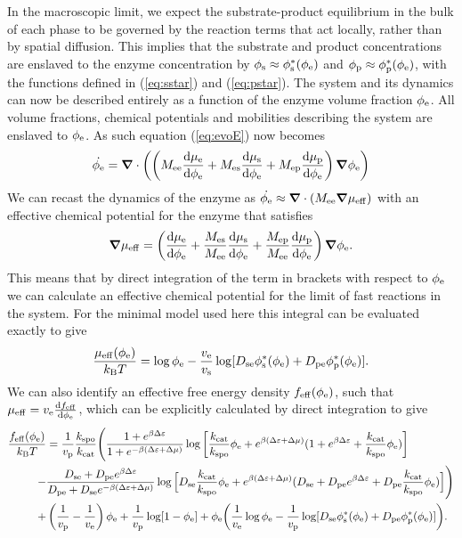 In the macroscopic limit, we expect the substrate-product equilibrium in the bulk of each phase to be governed by the reaction terms that act locally, rather than by spatial diffusion. This implies that the substrate and product concentrations are enslaved to the enzyme concentration by $\phi_{\mathrm{s}} \approx \phi_{\mathrm{s}}^*(\phi_{\mathrm{e}})$ and $\phi_{\mathrm{p}} \approx \phi_{\mathrm{p}}^*(\phi_{\mathrm{e}})$, with the functions defined in (\ref{eq:sstar}) and (\ref{eq:pstar}). The system and its dynamics can now be described entirely as a function of the enzyme volume fraction $\phi_{\mathrm{e}}$. All volume fractions, chemical potentials and mobilities describing the system are enslaved to $\phi_{\mathrm{e}}$. As such equation (\ref{eq:evoE}) now becomes
\begin{equation}
    \dot{\phi_{\mathrm{e}}} = \bm{\nabla} \cdot \left(\left(M_{\mathrm{ee}}\frac{\mathrm{d}\mu_{\mathrm{e}}}{\mathrm{d}\phi_{\mathrm{e}}} + M_{\mathrm{es}}\frac{\mathrm{d}\mu_{\mathrm{s}}}{\mathrm{d}\phi_{\mathrm{e}}} + M_{\mathrm{ep}}\frac{\mathrm{d}\mu_{\mathrm{p}}}{\mathrm{d}\phi_{\mathrm{e}}}\right)\bm{\nabla}\phi_{\mathrm{e}}\right)
\end{equation}
We can recast the dynamics of the enzyme as $\dot{\phi_{\mathrm{e}}}\approx \bm{\nabla} \cdot (M_{\mathrm{ee}}\bm{\nabla}\mu_\mathrm{eff})$ with an effective chemical potential for the enzyme that satisfies
\begin{equation}
    \bm{\nabla}\mu_\mathrm{eff} = \left(\frac{\text{d}\mu_{\mathrm{e}}}{\text{d}\phi_{\mathrm{e}}} + \frac{M_{\mathrm{es}}}{M_{\mathrm{ee}}}\frac{\text{d}\mu_{\mathrm{s}}}{\text{d}\phi_{\mathrm{e}}} + \frac{M_{\mathrm{ep}}}{M_{\mathrm{ee}}}\frac{\text{d}\mu_{\mathrm{p}}}{\text{d}\phi_{\mathrm{e}}}\right)\bm{\nabla}\phi_{\mathrm{e}}.
\end{equation}
This means that by direct integration of the term in brackets with respect to $\phi_{\mathrm{e}}$ we can calculate an effective chemical potential for the limit of fast reactions in the system. For the minimal model used here this integral can be evaluated exactly to give
\begin{equation}
    \frac{\mu_\mathrm{eff}(\phi_{\mathrm{e}})}{k_{\rm B} T} =  \log \phi_{\mathrm{e}} - \frac{v_{\mathrm{e}}}{v_{\mathrm{s}}} \log[D_{\mathrm{se}} \phi_{\mathrm{s}}^* (\phi_{\mathrm{e}}) + D_{\mathrm{pe}} \phi_{\mathrm{p}}^*(\phi_{\mathrm{e}})].
\end{equation}
We can also identify an effective free energy density $f_\mathrm{eff}(\phi_{\mathrm{e}})$, such that $\mu_\mathrm{eff}=v_{\mathrm{e}}\frac{\mathrm{d} f_\mathrm{eff}}{\mathrm{d} \phi_{\mathrm{e}}}$, which can be explicitly calculated by direct integration to give
\begin{equation}
\begin{split}
    \frac{f_\mathrm{eff}(\phi_{\mathrm{e}})}{k_{\rm B} T} &= \frac{1}{v_{\mathrm{p}}}\frac{k_{\mathrm{spo}}}{k_{\mathrm{cat}}}\Bigg(\frac{1+e^{\beta \Delta \varepsilon}}{1+e^{-\beta (\Delta \varepsilon + \Delta \mu)}}\log\left[\frac{k_{\mathrm{cat}}}{k_{\mathrm{spo}}}\phi_{\mathrm{e}} + e^{\beta (\Delta \varepsilon + \Delta \mu)}(1+e^{\beta \Delta \varepsilon} + \frac{k_{\mathrm{cat}}}{k_{\mathrm{spo}}}\phi_{\mathrm{e}})\right] \\
    -& \frac{D_{\mathrm{se}}+D_{\mathrm{pe}} e^{\beta \Delta \varepsilon}}{D_{\mathrm{pe}}+D_{\mathrm{se}} e^{-\beta (\Delta \varepsilon + \Delta \mu)}}\log\Big[D_{\mathrm{se}}\frac{k_{\mathrm{cat}}}{k_{\mathrm{spo}}}\phi_{\mathrm{e}} + e^{\beta (\Delta \varepsilon + \Delta \mu)}(D_{\mathrm{se}}+D_{\mathrm{pe}} e^{\beta \Delta \varepsilon} + D_{\mathrm{pe}} \frac{k_{\mathrm{cat}}}{k_{\mathrm{spo}}}\phi_{\mathrm{e}})\Big]\Bigg) \\
    +&\left(\frac{1}{v_{\mathrm{p}}}-\frac{1}{v_{\mathrm{e}}}\right)\phi_{\mathrm{e}} + \frac{1}{v_{\mathrm{p}}}\log[1-\phi_{\mathrm{e}}] + \phi_{\mathrm{e}}\bigg(\frac{1}{v_{\mathrm{e}}}\log\phi_{\mathrm{e}} - \frac{1}{v_{\mathrm{p}}} \log[D_{\mathrm{se}}\phi_{\mathrm{s}}^*(\phi_{\mathrm{e}})+D_{\mathrm{pe}}\phi_{\mathrm{p}}^*(\phi_{\mathrm{e}})]\bigg).
\end{split}
\end{equation}

